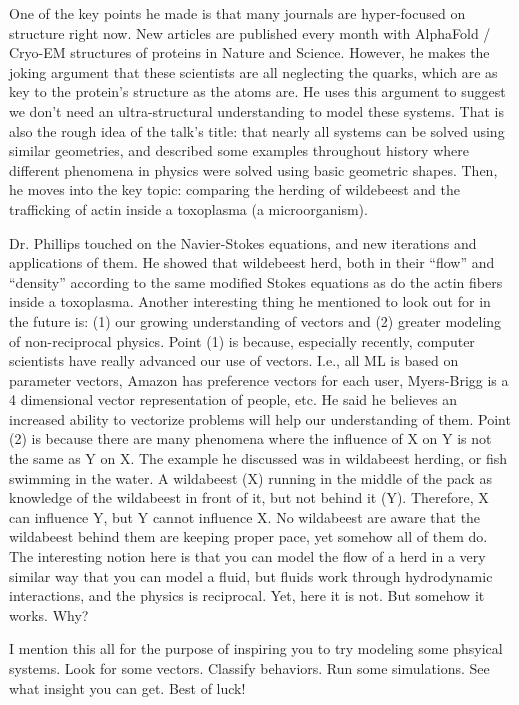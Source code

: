 One of the key points he made is that many journals are hyper-focused on structure right now. New articles are published every month with AlphaFold / Cryo-EM structures of proteins in Nature and Science. However, he makes the joking argument that these scientists are all neglecting the quarks, which are as key to the protein’s structure as the atoms are. He uses this argument to suggest we don’t need an ultra-structural understanding to model these systems. That is also the rough idea of the talk’s title: that nearly all systems can be solved using similar geometries, and described some examples throughout history where different phenomena in physics were solved using basic geometric shapes. Then, he moves into the key topic: comparing the herding of wildebeest and the trafficking of actin inside a toxoplasma (a microorganism).\newline

Dr. Phillips touched on the Navier-Stokes equations, and new iterations and applications of them. He showed that wildebeest herd, both in their ``flow” and ``density” according to the same modified Stokes equations as do the actin fibers inside a toxoplasma. Another interesting thing he mentioned to look out for in the future is: (1) our growing understanding of vectors and (2) greater modeling of non-reciprocal physics. Point (1) is because, especially recently, computer scientists have really advanced our use of vectors. I.e., all ML is based on parameter vectors, Amazon has preference vectors for each user, Myers-Brigg is a 4 dimensional vector representation of people, etc. He said he believes an increased ability to vectorize problems will help our understanding of them. Point (2) is because there are many phenomena where the influence of X on Y is not the same as Y on X. The example he discussed was in wildabeest herding, or fish swimming in the water. A wildabeest (X) running in the middle of the pack as knowledge of the wildabeest in front of it, but not behind it (Y). Therefore, X can influence Y, but Y cannot influence X. No wildabeest are aware that the wildabeest behind them are keeping proper pace, yet somehow all of them do. The interesting notion here is that you can model the flow of a herd in a very similar way that you can model a fluid, but fluids work through hydrodynamic interactions, and the physics is reciprocal. Yet, here it is not. But somehow it works. Why?\newline

I mention this all for the purpose of inspiring you to try modeling some phsyical systems. Look for some vectors. Classify behaviors. Run some simulations. See what insight you can get. Best of luck!


